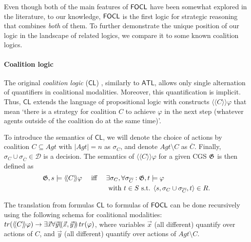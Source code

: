 \documentclass[sigconf,anonymous]{aamas}
\begin{document}
Even though both of the main features of $\mathsf{FOCL}$ have been somewhat explored in the literature, to our knowledge, $\mathsf{FOCL}$ is the first logic for strategic reasoning that combines \textit{both} of them. To further demonstrate the unique position of our logic in the landscape of related logics, we compare it to some known coalition logics. %




 \paragraph{Coalition logic} The original \textit{coalition logic} ($\mathsf{CL}$) \cite{pauly02}, similarly to $\mathsf{ATL}$, allows only single alternation of quantifiers in coalitional modalities. Moreover, this quantification is implicit. Thus, $\mathsf{CL}$ extends the language of propositional logic with constructs $\langle \! \langle C \rangle \! \rangle \varphi$ that mean `there is a strategy for coalition $C$ to achieve $\varphi$ in the next step (whatever agents outside of the coalition do at the same time)'. 
 
 To introduce the semantics of $\mathsf{CL}$, we will denote the choice of actions by coalition $C \subseteq Agt$ with $|Agt| = n$ as $\sigma_C$, and denote $Agt \setminus C$ as $\overline{C}$. Finally, $\sigma_C \cup \sigma_{{\overline{C}}} \in \mathcal{D}$ is a decision. The semantics of $\langle \! \langle C \rangle \! \rangle \varphi$ for a given CGS $\mathfrak{G}$ is then defined as 
  \begin{alignat*}{3}
        &\mathfrak{G},s \models \langle \! \langle C \rangle \! \rangle \varphi && \text{ iff } && \exists \sigma_C, \forall \sigma_{\overline{C}} : \mathfrak{G},t \models \varphi \\
        & && &&\text{ with } t \in S \text{ s.t. } \langle s, \sigma_C \cup \sigma_{\overline{C}}, t \rangle \in R.   
\end{alignat*}     
 
The translation from formulas $\mathsf{CL}$ to formulas of $\mathsf{FOCL}$ can be done recursively using the following schema for coalitional modalities: 
$tr(\langle \! \langle C \rangle \! \rangle \varphi) \to \exists \vec x \forall \vec y (\!( \vec x, \vec y )\!)\, tr(\varphi)$, 
where variables $\vec x$ (all different) quantify over actions of $C$, and $\vec y$ (all different) quantify over actions of $Agt \setminus C$. 
\end{document}
